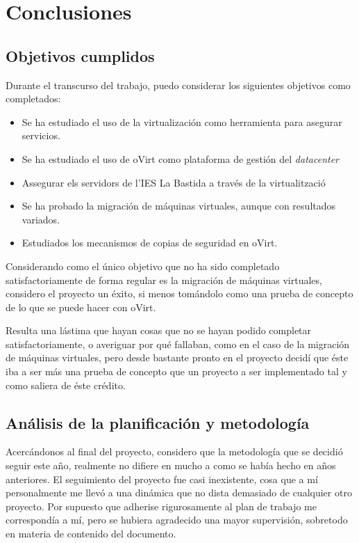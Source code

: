 \chapter{Conclusiones}
\label{ch:conclusiones}

\section{Objetivos cumplidos}
\label{sec:objetivos}

Durante el transcurso del trabajo, puedo considerar los siguientes objetivos como completados:

\begin{itemize}
    \item Se ha estudiado el uso de la virtualización como herramienta para asegurar servicios.
    \item Se ha estudiado el uso de oVirt como plataforma de gestión del \emph{datacenter}
    \item Assegurar els servidors de l'IES La Bastida a través de la virtualització
    \item Se ha probado la migración de máquinas virtuales, aunque con resultados variados.
    \item Estudiados los mecanismos de copias de seguridad en oVirt.
\end{itemize}

Considerando como el único objetivo que no ha sido completado satisfactoriamente de forma regular es la migración de máquinas virtuales, considero el proyecto un éxito, si menos tomándolo como una prueba de concepto de lo que se puede hacer con oVirt.

Resulta una lástima que hayan cosas que no se hayan podido completar satisfactoriamente, o averiguar por qué fallaban, como en el caso de la migración de máquinas virtuales, pero desde bastante pronto en el proyecto decidí que éste iba a ser más una prueba de concepto que un proyecto a ser implementado tal y como saliera de éste crédito.

\section{Análisis de la planificación y metodología}
\label{sec:plan_metod}

Acercándonos al final del proyecto, considero que la metodología que se decidió seguir este año, realmente no difiere en mucho a como se había hecho en años anteriores. El seguimiento del proyecto fue casi inexistente, cosa que a mí personalmente me llevó a una dinámica que no dista demasiado de cualquier otro proyecto. Por supuesto que adherise rigurosamente al plan de trabajo me correspondía a mí, pero se hubiera agradecido una mayor supervisión, sobretodo en materia de contenido del documento.


